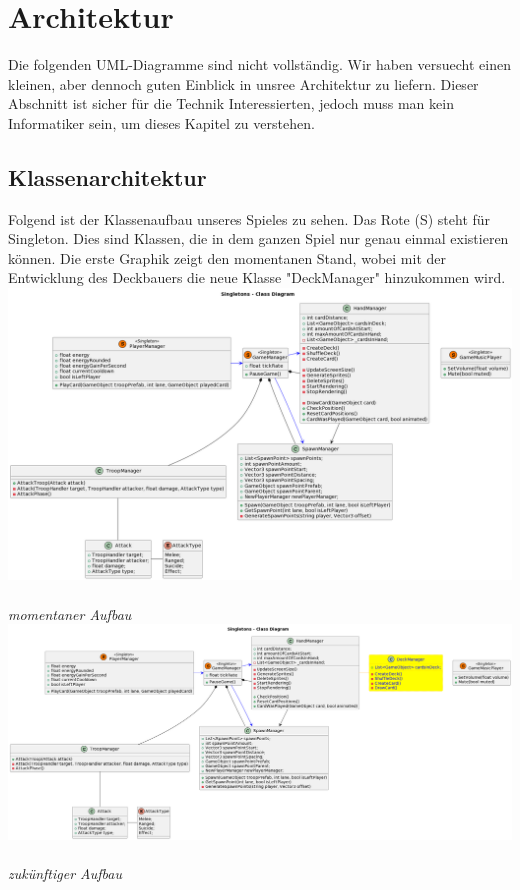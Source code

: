 \chapter{Architektur}
Die folgenden UML-Diagramme sind nicht vollständig.
Wir haben versuecht einen kleinen, aber dennoch guten Einblick in unsree Architektur zu liefern.
Dieser Abschnitt ist sicher für die Technik Interessierten, jedoch muss man kein Informatiker sein, um dieses Kapitel zu verstehen.

\section{Klassenarchitektur}
Folgend ist der Klassenaufbau unseres Spieles zu sehen.
Das Rote (S) steht für Singleton.
Dies sind Klassen, die in dem ganzen Spiel nur genau einmal existieren können.
Die erste Graphik zeigt den momentanen Stand, wobei mit der Entwicklung des Deckbauers die neue Klasse "DeckManager" hinzukommen wird. \\
\includegraphics[width=14cm]{resources/Singletons.png} \\
\textit{momentaner Aufbau} \\
\includegraphics[width=14.5cm]{resources/Singletons 2.png} \\
\textit{zukünftiger Aufbau}

